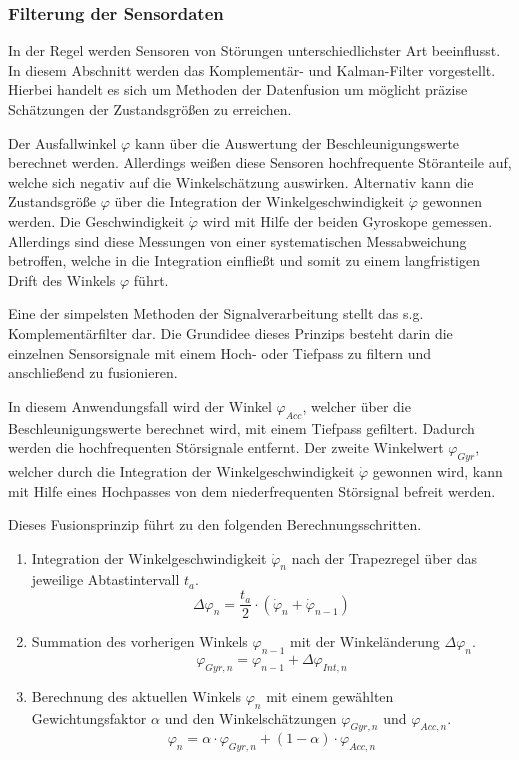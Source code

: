 \subsubsection{Filterung der Sensordaten}
In der Regel werden Sensoren von Störungen unterschiedlichster Art beeinflusst. In diesem Abschnitt werden das Komplementär- und Kalman-Filter vorgestellt. Hierbei handelt es sich um Methoden der Datenfusion um möglicht präzise Schätzungen der Zustandsgrößen zu erreichen.

Der Ausfallwinkel $\varphi$ kann über die Auswertung der Beschleunigungswerte berechnet werden. Allerdings weißen diese Sensoren hochfrequente Störanteile auf, welche sich negativ auf die Winkelschätzung auswirken. Alternativ kann die Zustandsgröße $\varphi$ über die Integration der Winkelgeschwindigkeit $\dot{\varphi}$ gewonnen werden. Die Geschwindigkeit $\dot{\varphi}$ wird mit Hilfe der beiden Gyroskope gemessen. Allerdings sind diese Messungen von einer systematischen Messabweichung betroffen, welche in die Integration einfließt und somit zu einem langfristigen Drift des Winkels $\varphi$ führt.

Eine der simpelsten Methoden der Signalverarbeitung stellt das s.g. Komplementärfilter dar. Die Grundidee dieses Prinzips besteht darin die einzelnen Sensorsignale mit einem Hoch- oder Tiefpass zu filtern und anschließend zu fusionieren. 

In diesem Anwendungsfall wird der Winkel $\varphi_{Acc}$, welcher über die Beschleunigungswerte berechnet wird, mit einem Tiefpass gefiltert. Dadurch werden die hochfrequenten Störsignale entfernt. Der zweite Winkelwert $\varphi_{Gyr}$, welcher durch die Integration der Winkelgeschwindigkeit $\dot{\varphi}$ gewonnen wird, kann mit Hilfe eines Hochpasses von dem niederfrequenten Störsignal befreit werden.

Dieses Fusionsprinzip führt zu den folgenden Berechnungsschritten.

\begin{enumerate}
 \item Integration der Winkelgeschwindigkeit $\dot{\varphi}_n$ nach der Trapezregel über das jeweilige Abtastintervall $t_a$.
 \begin{equation}
 \Delta \varphi_n = \frac{t_a}{2} \cdot (\dot{\varphi}_n + \dot{\varphi}_{n-1})
 \end{equation}
 \item Summation des vorherigen Winkels $\varphi_{n-1}$ mit der Winkeländerung $\Delta \varphi_{n}$.
 \begin{equation}
 \varphi_{Gyr,n} = \varphi_{n-1} + \Delta \varphi_{Int,n}
 \end{equation}
 \item Berechnung des aktuellen Winkels $\varphi_n$ mit einem gewählten Gewichtungsfaktor $\alpha$ und den Winkelschätzungen $\varphi_{Gyr,n}$ und $\varphi_{Acc,n}$.
 \begin{equation}
 \varphi_n = \alpha \cdot \varphi_{Gyr,n} + (1-\alpha) \cdot \varphi_{Acc,n}
 \end{equation}
\end{enumerate}

